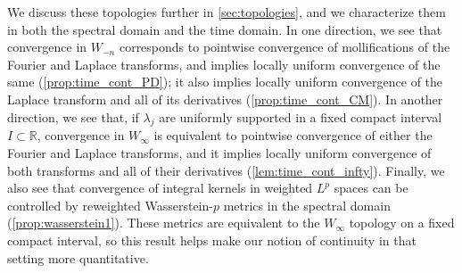 \documentclass{cams-l} %
\newcommand{\RR}{\mathbb R}
\theoremstyle{definition}
\theoremstyle{remark}
\numberwithin{equation}{section}
\begin{document}
We discuss these topologies further in \cref{sec:topologies}, and we characterize them in both the spectral domain and the time domain. In one direction, we see that convergence in $W_{-n}$ corresponds to pointwise convergence of mollifications of the Fourier and Laplace transforms, and implies locally uniform convergence of the same (\cref{prop:time_cont_PD}); it also implies locally uniform convergence of the Laplace transform and all of its derivatives (\cref{prop:time_cont_CM}). In another direction, we see that, if $\lambda_j$ are uniformly supported in a fixed compact interval $I\subset\RR$, convergence in $W_\infty$ is equivalent to pointwise convergence of either the Fourier and Laplace transforms, and it implies locally uniform convergence of both transforms and all of their derivatives (\cref{lem:time_cont_infty}). Finally, we also see that convergence of integral kernels in weighted $L^p$ spaces can be controlled by reweighted Wasserstein-$p$ metrics in the spectral domain (\cref{prop:wasserstein1}). These metrics are equivalent to the $W_\infty$ topology on a fixed compact interval, so this result helps make our notion of continuity in that setting more quantitative.
\end{document}
